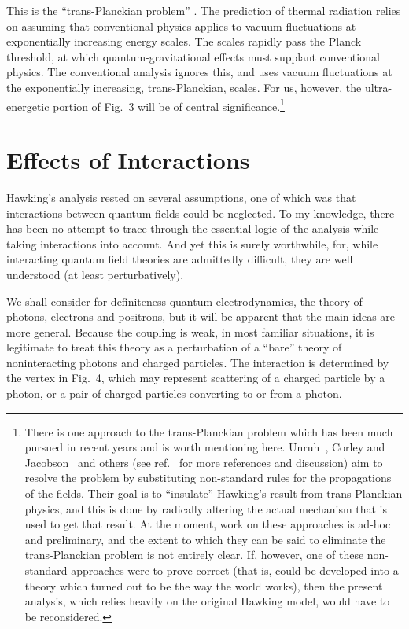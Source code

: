 \documentclass[12pt]{article}
\begin{document}
This is the ``trans-Planckian problem'' \cite{Gibbons:1977,Helfer:2003}.   The
prediction of thermal radiation relies on assuming that conventional physics
applies to vacuum fluctuations at exponentially increasing energy scales.  The
scales rapidly pass the Planck threshold, at which quantum-gravitational
effects must supplant conventional physics. The conventional  analysis
\cite{Hawking:1974,Hawking:1975} ignores this, and uses vacuum fluctuations at
the exponentially increasing, trans-Planckian, scales. For us, however, the
ultra-energetic portion of Fig.~3 will be of central
significance.\footnote{There is one approach to the trans-Planckian problem 
which has been much pursued in recent years and is worth mentioning here.  
Unruh~\cite{Unruh:1995}, Corley and Jacobson~\cite{CJ:1996} and others (see 
ref.~\cite{Helfer:2003} for more references and discussion) aim to resolve the
problem by substituting non-standard rules for the propagations of the fields. 
Their goal is to ``insulate'' Hawking's  result from trans-Planckian physics,
and this is done by radically altering the actual mechanism that is used to get
that result. At the moment, work on these approaches is ad-hoc and preliminary,
and the extent to which they can be said to eliminate the trans-Planckian
problem is not entirely clear.  If, however, one of these non-standard 
approaches were to prove correct (that is, could be developed into a  theory
which turned out to be the way the world works), then the present  analysis,
which relies heavily on the original Hawking model, would have to be
reconsidered.}

\section{Effects of Interactions}
\label{EI}

Hawking's analysis rested on several assumptions,  one of which was
that interactions between quantum fields could be neglected.  To my knowledge,
there has been no attempt to trace through the essential logic of the analysis
while taking interactions into account. And yet this is surely worthwhile, for,
while interacting quantum field theories are admittedly difficult, they are
well understood (at least perturbatively).  

We shall consider for definiteness quantum electrodynamics, the theory of
photons, electrons and positrons, but it will be apparent that the main ideas
are more general.  Because the coupling is weak, in most familiar situations,
it is legitimate to treat this theory as a perturbation of a ``bare'' theory of
noninteracting photons and charged particles.  The interaction is determined by
the vertex in Fig.~4, which may represent scattering of a charged particle by a
photon, or a pair of charged particles converting to or from a photon.
\end{document}
